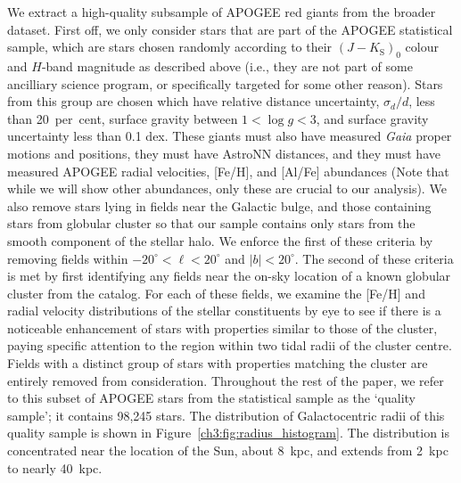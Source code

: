 We extract a high-quality subsample of APOGEE red giants from the broader dataset. First off, we only consider stars that are part of the APOGEE statistical sample, which are stars chosen randomly according to their $(J-K_\mathrm{S})_{0}$ colour and $H$-band magnitude as described above (i.e., they are not part of some ancilliary science program, or specifically targeted for some other reason). Stars from this group are chosen which have relative distance uncertainty, $\sigma_{d}/d$, less than 20~per~cent, surface gravity between $1 < \log g < 3$, and surface gravity uncertainty less than 0.1 dex. These giants must also have measured \textit{Gaia} proper motions and positions, they must have AstroNN distances, and they must have measured APOGEE radial velocities, [Fe/H], and [Al/Fe] abundances (Note that while we will show other abundances, only these are crucial to our analysis). We also remove stars lying in fields near the Galactic bulge, and those containing stars from globular cluster so that our sample contains only stars from the smooth component of the stellar halo. We enforce the first of these criteria by removing fields within $-20^{\circ} < \ell < 20^{\circ}$ and $|b| < 20^{\circ}$. The second of these criteria is met by first identifying any fields near the on-sky location of a known globular cluster from the \textcite[][December 2010 version]{harris96} catalog. For each of these fields, we examine the [Fe/H] and radial velocity distributions of the stellar constituents by eye to see if there is a noticeable enhancement of stars with properties similar to those of the cluster, paying specific attention to the region within two tidal radii of the cluster centre. Fields with a distinct group of stars with properties matching the cluster are entirely removed from consideration. Throughout the rest of the paper, we refer to this subset of APOGEE stars from the statistical sample as the `quality sample'; it contains 98,245 stars. The distribution of Galactocentric radii of this quality sample is shown in Figure~\ref{ch3:fig:radius_histogram}. The distribution is concentrated near the location of the Sun, about 8~kpc, and extends from 2~kpc to nearly 40~kpc.

